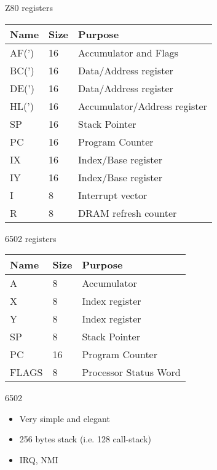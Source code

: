 \documentclass[aspectratio=43]{uva-inf-presentation}
\begin{document}

\begin{frame}{Z80 registers}

\begin{tabular}{|l|l|l|}
\hline Name & Size & Purpose \\ \hline
AF(') & 16 & Accumulator and Flags \\
BC(') & 16 & Data/Address register \\
DE(') & 16 & Data/Address register \\
HL(') & 16 & Accumulator/Address register \\
SP & 16 & Stack Pointer \\
PC & 16 & Program Counter \\
IX & 16 & Index/Base register \\
IY & 16 & Index/Base register \\
I & 8 & Interrupt vector \\
R & 8 & DRAM refresh counter \\ \hline
\end{tabular}

\end{frame}


\begin{frame}{6502 registers}

\begin{tabular}{|l|l|l|}
\hline Name & Size & Purpose \\ \hline
A & 8 & Accumulator \\
X & 8 & Index register \\
Y & 8 & Index register \\
SP & 8 & Stack Pointer \\
PC & 16 & Program Counter \\
FLAGS & 8 & Processor Status Word \\ \hline
\end{tabular}

\end{frame}


\begin{frame}{6502}

\begin{itemize}
\item Very simple and elegant
\item 256 bytes stack (i.e. 128 call-stack)
\item IRQ, NMI
\end{itemize}

\end{frame}
\end{document}
